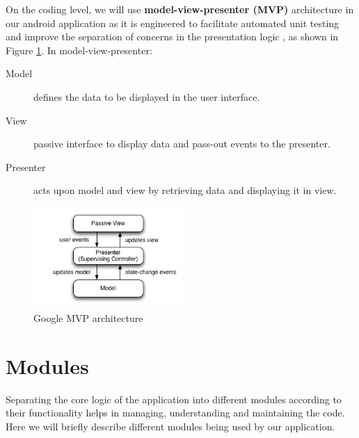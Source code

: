 On the coding level, we will use \textbf{model-view-presenter (MVP)} architecture in our android application as it is engineered to facilitate automated unit testing and improve the separation of concerns in the presentation logic \cite{MVP2018}, as shown in Figure \ref{fig:Model_View_Presenter_GUI_Design_Pattern}. In model-view-presenter:
\begin{description}
    \item[Model] defines the data to be displayed in the user interface.
    \item[View] passive interface to display data and pass-out events to the presenter.
    \item[Presenter] acts upon model and view by retrieving data and displaying it in view.
\end{description}

\begin{figure}
    \centering
        \includegraphics[width=0.50\textwidth]{images/Model_View_Presenter_GUI_Design_Pattern.png}
    \caption{Google MVP architecture}
    \label{fig:Model_View_Presenter_GUI_Design_Pattern}
\end{figure}


\section{Modules}
Separating the core logic of the application into different modules according to their functionality helps in managing, understanding and maintaining the code. Here we will briefly describe different modules being used by our application. 


